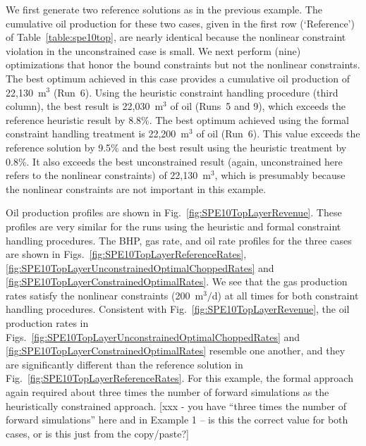 \documentclass[twocolumn,numbook]{svjour3}          %
\begin{document}
We first generate two reference solutions as in the previous example. The cumulative oil production for these two cases, given in the first row (`Reference') of Table~\ref{table:spe10top}, are nearly identical because the nonlinear constraint violation in the
unconstrained case is small. We next perform (nine) optimizations that honor the bound constraints but not the nonlinear constraints. The best optimum achieved in this case provides a cumulative oil production of 22,130~m$^3$ (Run~6). Using the heuristic constraint handling procedure (third column), the best result is 22,030~m$^3$ of oil (Runs~5 and 9), which
exceeds the reference heuristic result by 8.8\%. The best optimum achieved using the formal constraint handling treatment is 22,200~m$^3$ of oil (Run~6). This value exceeds the reference solution by 9.5\% and the best result using the heuristic treatment by 0.8\%. It also exceeds the best unconstrained result (again, unconstrained here refers to the nonlinear constraints) of 22,130~m$^3$, which is presumably because the nonlinear constraints are not important in this example.

Oil production profiles are shown in Fig.~\ref{fig:SPE10TopLayerRevenue}. These profiles are very similar for the runs using the heuristic and formal constraint handling procedures. The BHP, gas rate, and oil rate profiles for the three cases are shown in
Figs.~\ref{fig:SPE10TopLayerReferenceRates},
\ref{fig:SPE10TopLayerUnconstrainedOptimalChoppedRates} and
\ref{fig:SPE10TopLayerConstrainedOptimalRates}. We see that the gas production rates satisfy the nonlinear constraints (200~m$^3/$d) at all times for both constraint handling procedures. Consistent with Fig.~\ref{fig:SPE10TopLayerRevenue}, the oil production rates in Figs.~\ref{fig:SPE10TopLayerUnconstrainedOptimalChoppedRates} and
\ref{fig:SPE10TopLayerConstrainedOptimalRates} resemble one another, and they are significantly different than the reference solution in Fig.~\ref{fig:SPE10TopLayerReferenceRates}. For this example, the formal approach again required about three times the number of forward
simulations as the heuristically constrained approach. [xxx - you have ``three times the number of forward simulations'' here and in Example 1 -- is this the correct value for both cases, or is this just from the copy/paste?]
\end{document}
